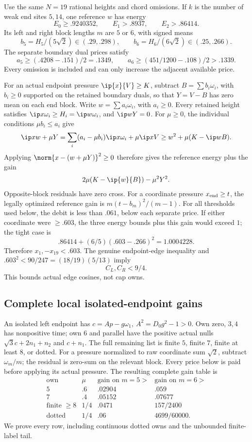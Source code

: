 Use the same \(N=19\) rational heights and chord
omissions. If \(k\) is the number of weak end
sites \(5,14\), one reference \(w\) has energy
\[
 E_0\geq.9240352,\qquad E_1>.8937,\qquad E_2>.86414.
\]
Its left and right block lengths \(m\) are \(5\)
or \(6\), with signed means
\[
 b_5=H_5/(5\sqrt2)\in(.29,.298),\qquad
 b_6=H_6/(6\sqrt2)\in(.25,.266).
\]
The separate boundary dual prices satisfy
\[
 a_5\geq(.4208-.151)/2=.1349,\qquad
 a_6\geq(451/1200-.108)/2>.1339.
\]
Every omission is included and can only increase
the adjacent available price.

For an actual endpoint pressure \(\ip{x}{V}\geq K\),
subtract \(B=\sum b_i\omega_i\), with \(b_i\geq0\) supported
on the retained boundary duals, so that \(Y=V-B\) has zero mean
on each end block. Write \(w=\sum a_i\omega_i\), with \(a_i\geq0\).
Every retained height satisfies \(\ip x{\omega_i}\geq H_i
=\ip w{\omega_i}\), and \(\ip wY=0\).
For \(\mu\geq0\), the individual conditions \(\mu b_i\leq a_i\)
give
\[
 \ip x{w+\mu Y}
 =\sum_i(a_i-\mu b_i)\ip x{\omega_i}+\mu\ip xV
 \geq w^2+\mu(K-\ip wB).
\]
Applying \(\norm{x-(w+\mu Y)}^2\geq0\) therefore gives the
reference energy plus the gain
\[
 2\mu(K-\ip{w}{B})-\mu^2Y^2.
\]
Opposite-block residuals have zero cross.
For a coordinate pressure \(x_{\rm end}\geq t\),
the legally optimized reference gain is
\(m(t-b_m)^2/(m-1)\).
For all thresholds used below, the debit is
less than \(.061\), below each separate price.
If either coordinate were \(\geq.603\), the
three energy bounds plus this gain would exceed
\(1\); the tight case is
\[
 .86414+(6/5)(.603-.266)^2=1.0004228.
\]
Therefore \(x_1,-x_{19}<.603\).
The genuine endpoint-edge inequality and
\(.603^2<90/247=(18/19)(5/13)\) imply
\begin{equation}\label{app:eq:A18shortends}
 C_L,C_R<9/4.
\end{equation}
This bounds actual edge cosines, not cap owns.

\subsection{Complete local isolated-endpoint gains}
An isolated left endpoint has
\(c=A p-g\omega_1,\ A^2=D_0g^2-1>0\).
Own zero, \(3,4\) has nonpositive time; own
\(6\) and parallel have the positive actual
nulls \(\sqrt3c+2n_1+n_2\) and \(c+n_1\).
The full remaining list is finite \(5\), finite
\(7\), finite at least \(8\), or dotted.
For a pressure normalized to raw coordinate
sum \(\sqrt2\), subtract \(\omega_m/m\);
the residual is zero-sum on the relevant block.
Every price below is paid before applying its
actual pressure. The resulting complete gain
table is
\[
\begin{array}{c|c|c|c}
\text{own}&\mu&\text{gain on }m=5>&
 \text{gain on }m=6>\\ \hline
5&.6&.02904&.059\\
7&.4&.05152&.07677\\
\text{finite }\geq8&1/4&.0471&157/2400\\
\text{dotted}&1/4&.06&4699/60000.
\end{array}
\]
We prove every row, including continuous dotted
owns and the unbounded finite-label tail.

